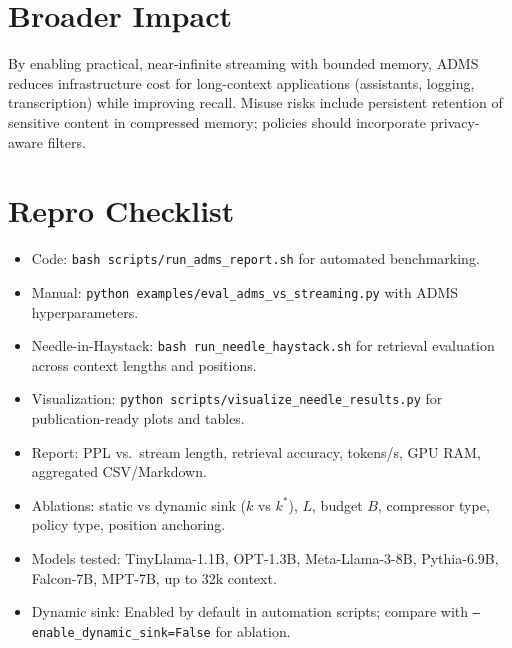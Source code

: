 \documentclass[11pt]{article}
\newcommand{\model}{\textsc{ADMS}} %
\begin{document}
\section{Broader Impact}
By enabling practical, near-infinite streaming with bounded memory, \model{} reduces infrastructure cost for long-context applications (assistants, logging, transcription) while improving recall. Misuse risks include persistent retention of sensitive content in compressed memory; policies should incorporate privacy-aware filters.

\section*{Repro Checklist}
\begin{itemize}
  \item Code: \texttt{bash scripts/run\_adms\_report.sh} for automated benchmarking.
  \item Manual: \texttt{python examples/eval\_adms\_vs\_streaming.py} with ADMS hyperparameters.
  \item Needle-in-Haystack: \texttt{bash run\_needle\_haystack.sh} for retrieval evaluation across context lengths and positions.
  \item Visualization: \texttt{python scripts/visualize\_needle\_results.py} for publication-ready plots and tables.
  \item Report: PPL vs.\ stream length, retrieval accuracy, tokens/s, GPU RAM, aggregated CSV/Markdown.
  \item Ablations: static vs dynamic sink ($k$ vs $k^*$), $L$, budget $B$, compressor type, policy type, position anchoring.
  \item Models tested: TinyLlama-1.1B, OPT-1.3B, Meta-Llama-3-8B, Pythia-6.9B, Falcon-7B, MPT-7B, up to 32k context.
  \item Dynamic sink: Enabled by default in automation scripts; compare with \texttt{--enable\_dynamic\_sink=False} for ablation.
\end{itemize}
\end{document}
